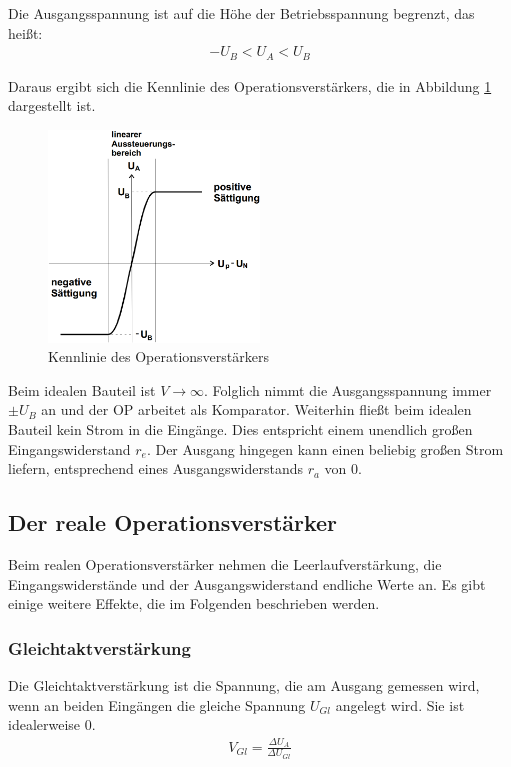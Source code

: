 Die Ausgangsspannung ist auf die Höhe der Betriebsspannung begrenzt, das heißt:
\begin{align}
	-U_B < U_A < U_B
\end{align}

Daraus ergibt sich die Kennlinie des Operationsverstärkers, die in Abbildung \ref{fig:kennlinie} dargestellt ist.
\begin{figure}
	\centering
	\includegraphics[width=0.5\textwidth]{img/kennlinie.png}
	\caption{Kennlinie des Operationsverstärkers \cite{v51}}
	\label{fig:kennlinie}
\end{figure}

Beim idealen Bauteil ist $V \rightarrow \infty$.
Folglich nimmt die Ausgangsspannung immer $\pm U_B$ an und der OP arbeitet als Komparator.
Weiterhin fließt beim idealen Bauteil kein Strom in die Eingänge.
Dies entspricht einem unendlich großen Eingangswiderstand $r_e$.
Der Ausgang hingegen kann einen beliebig großen Strom liefern, entsprechend eines Ausgangswiderstands $r_a$ von $0$.

\subsection{Der reale Operationsverstärker}

Beim realen Operationsverstärker nehmen die Leerlaufverstärkung, die Eingangswiderstände und der Ausgangswiderstand endliche Werte an.
Es gibt einige weitere Effekte, die im Folgenden beschrieben werden.

\subsubsection{Gleichtaktverstärkung}
Die Gleichtaktverstärkung ist die Spannung, die am Ausgang gemessen wird, wenn an beiden Eingängen die gleiche Spannung $U_{Gl}$ angelegt wird.
Sie ist idealerweise $0$.
\begin{align}
	V_{Gl} = \frac{\Delta U_A}{\Delta U_{Gl}}
\end{align}

